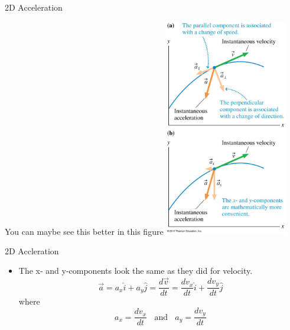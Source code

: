 \documentclass{beamer}
\begin{document}
\begin{frame}{2D Acceleration}
\begin{center}
   You can maybe see this better in this figure
   \includegraphics[width=0.4\textwidth]{../figures/04_06_Figure.jpg}
\end{center}
\end{frame}

\begin{frame}{2D Accleration}
\begin{itemize}
   \item The x- and y-components look the same as they did for velocity.
   \begin{equation*}
      \vec{a} = a_x\hat{i} + a_y\hat{j} = \frac{d\vec{v}}{dt} = \frac{dv_x}{dt}\hat{i} + \frac{dv_y}{dt}\hat{j}
   \end{equation*}
   where
   \begin{equation*}
      a_x = \frac{dv_x}{dt}~~~~\text{and}~~~~ a_y = \frac{dv_y}{dt}
   \end{equation*}
\end{itemize}
\end{frame}
\end{document}
